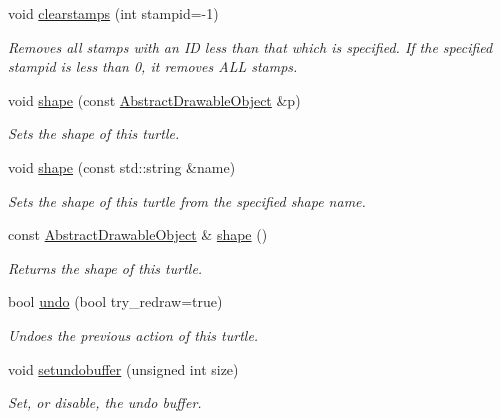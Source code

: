 \begin{DoxyCompactItemize}
void \hyperlink{classcturtle_1_1Turtle_a92d143232f35dd3ff64af3236182442d}{clearstamps} (int stampid=-\/1)
\begin{DoxyCompactList}\small\item\em Removes all stamps with an ID less than that which is specified. If the specified stampid is less than 0, it removes A\+LL stamps. \end{DoxyCompactList}\item 
void \hyperlink{classcturtle_1_1Turtle_a5143887bbdb59bb55f583b62b2152a8e}{shape} (const \hyperlink{classcturtle_1_1AbstractDrawableObject}{Abstract\+Drawable\+Object} \&p)
\begin{DoxyCompactList}\small\item\em Sets the shape of this turtle. \end{DoxyCompactList}\item 
void \hyperlink{classcturtle_1_1Turtle_aecd7fb607369e3ece1854caa6ed92128}{shape} (const std\+::string \&name)
\begin{DoxyCompactList}\small\item\em Sets the shape of this turtle from the specified shape name. \end{DoxyCompactList}\item 
\mbox{\label{classcturtle_1_1Turtle_ab5b05852723852c00681da0844124e44}} 
const \hyperlink{classcturtle_1_1AbstractDrawableObject}{Abstract\+Drawable\+Object} \& \hyperlink{classcturtle_1_1Turtle_ab5b05852723852c00681da0844124e44}{shape} ()
\begin{DoxyCompactList}\small\item\em Returns the shape of this turtle. \end{DoxyCompactList}\item 
\mbox{\label{classcturtle_1_1Turtle_a123ef5c4bb86046e43a7bb138de81566}} 
bool \hyperlink{classcturtle_1_1Turtle_a123ef5c4bb86046e43a7bb138de81566}{undo} (bool try\+\_\+redraw=true)
\begin{DoxyCompactList}\small\item\em Undoes the previous action of this turtle. \end{DoxyCompactList}\item 
void \hyperlink{classcturtle_1_1Turtle_a91536102f8903dc237d97dbf3f326eba}{setundobuffer} (unsigned int size)
\begin{DoxyCompactList}\small\item\em Set, or disable, the undo buffer. \end{DoxyCompactList}\item 

\end{DoxyCompactItemize}
